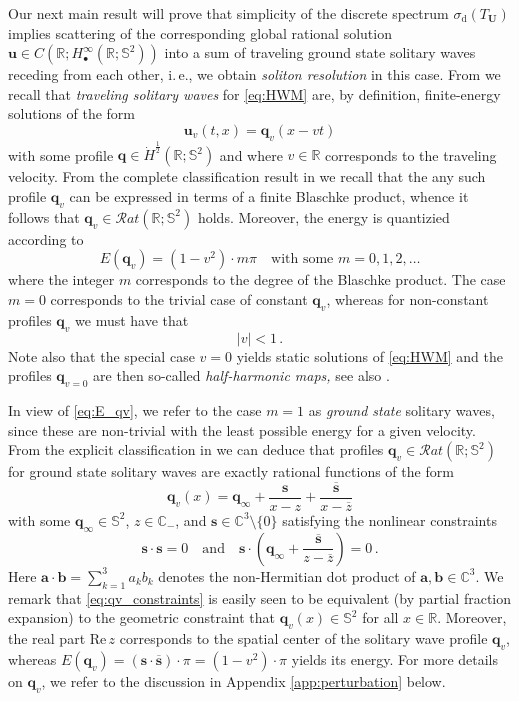 \documentclass[11pt,reqno]{amsart}
\theoremstyle{definition}
\theoremstyle{remark}
\theoremstyle{remark}
\numberwithin{equation}{section}
\newcommand{\C}{\mathbb{C}}
\newcommand{\R}{\mathbb{R}}
\newcommand{\Ss}{\mathbb{S}}
\newcommand{\ov}{\overline}
\newcommand{\sv}{\mathbf{s}}
\newcommand{\qv}{\mathbf{q}}
\newcommand{\be}{\begin{equation}}
\newcommand{\ee}{\end{equation}}
\newcommand{\uu}{\mathbf{u}}
\newcommand{\Ub}{\mathbf{U}}
\begin{document}
Our next main result will prove that simplicity of the discrete spectrum $\sigma_{\mathrm{d}}(T_{\Ub})$ implies scattering of the corresponding global rational solution $\uu \in C(\R; H^\infty_\bullet(\R; \Ss^2))$ into a sum of traveling ground state solitary waves receding from each other, i.\,e., we obtain {\em soliton resolution} in this case. From \cite{LeSc-18} we recall that {\em traveling solitary waves} for \eqref{eq:HWM} are, by definition, finite-energy solutions of the form
\be
\uu_{v}(t,x) = \qv_v(x- vt)
\ee 
with some profile $\qv \in \dot{H}^{\frac{1}{2}}(\R; \Ss^2)$ and where $v \in \R$ corresponds to the traveling velocity. From the complete classification result in \cite{LeSc-18} we recall that the any such profile $\qv_v$ can be expressed in terms of a finite Blaschke product, whence it follows that $\qv_v \in \mathcal{R}at(\R; \Ss^2)$ holds. Moreover, the energy is quantizied according to  
\be \label{eq:E_qv}
E(\qv_v) = (1-v^2) \cdot m \pi \quad \mbox{with some $m=0,1,2, \ldots$}
\ee
where the integer $m$ corresponds to the degree of the Blaschke product. The case $m=0$ corresponds to the trivial case of constant $\qv_v$, whereas for non-constant profiles $\qv_v$ we must have that 
\be
|v| < 1 \, .
\ee
Note also that the special case $v=0$ yields static solutions of \eqref{eq:HWM} and the profiles $\qv_{v=0}$ are then so-called {\em half-harmonic maps,} see also \cite{DaRi-11,MiSi-15}.

 In view of \eqref{eq:E_qv}, we refer to the case $m=1$ as {\em ground state} solitary waves, since these are non-trivial with the least possible energy for a given velocity. From the explicit classification in \cite{LeSc-18} we can deduce that profiles $\qv_v \in \mathcal{R}at(\R; \Ss^2)$ for ground state solitary waves are exactly rational functions of the form
\be
\qv_v(x) = \qv_\infty + \frac{\sv}{x-z} + \frac{\ov{\sv}}{x-\ov{z}}
\ee
with some $\qv_\infty \in \Ss^2$, $z \in \C_-$, and  $\sv \in \C^3 \setminus \{ 0 \}$ satisfying the nonlinear constraints
\be \label{eq:qv_constraints}
\sv \cdot \sv = 0 \quad \mbox{and} \quad \sv \cdot \left ( \qv_\infty + \frac{\ov{\sv}}{z-\ov{z}} \right ) = 0 \, .
\ee
Here $\mathbf{a} \cdot \mathbf{b} = \sum_{k=1}^3 a_k b_k$ denotes the non-Hermitian dot product of $\mathbf{a}, \mathbf{b} \in \C^3$. We remark that  \eqref{eq:qv_constraints} is easily seen to be equivalent (by partial fraction expansion) to the geometric constraint that $\qv_v(x) \in \Ss^2$ for all $x \in \R$. Moreover, the real part $\mathrm{Re} \, z$ corresponds to the spatial center of the solitary wave profile $\qv_v$, whereas $E(\qv_v)= (\sv \cdot \ov{\sv}) \cdot \pi = (1-v^2) \cdot \pi$ yields its energy. For more details on $\qv_v$, we refer to the discussion in Appendix \ref{app:perturbation} below.
\end{document}
